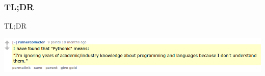 \begin{frame}
\frametitle{TL;DR}
\begin{block}{TL;DR}
\begin{center}
\includegraphics[width=0.85\paperwidth]{image/pythonic.png}
\end{center}
\end{block}
\end{frame}

